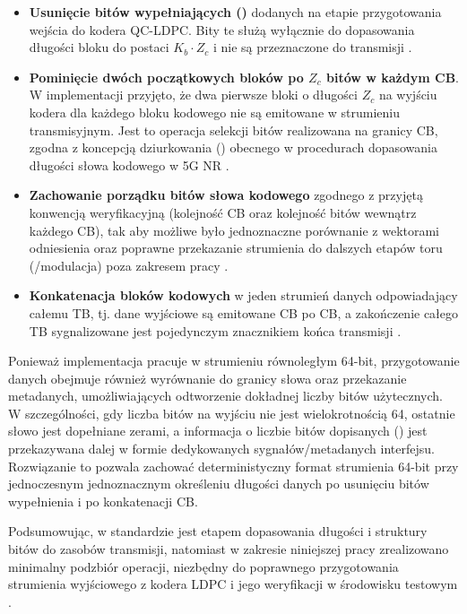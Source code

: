 \begin{itemize}
  \item \textbf{Usunięcie bitów wypełniających ()} dodanych na etapie przygotowania wejścia do kodera QC-LDPC.
  Bity te służą wyłącznie do dopasowania długości bloku do postaci $K_b \cdot Z_c$ i nie są przeznaczone do transmisji \cite{bib:3gpp_38212}.

  \item \textbf{Pominięcie dwóch początkowych bloków po $Z_c$ bitów w każdym CB}.
  W implementacji przyjęto, że dwa pierwsze bloki o długości $Z_c$ na wyjściu kodera dla każdego bloku kodowego nie są emitowane w strumieniu transmisyjnym.
  Jest to operacja selekcji bitów realizowana na granicy CB, zgodna z koncepcją dziurkowania ()  obecnego w procedurach dopasowania długości słowa kodowego w 5G NR \cite{bib:3gpp_38212}.

  \item \textbf{Zachowanie porządku bitów słowa kodowego} zgodnego z przyjętą konwencją weryfikacyjną (kolejność CB oraz kolejność bitów
  wewnątrz każdego CB), tak aby możliwe było jednoznaczne porównanie z wektorami odniesienia oraz poprawne przekazanie strumienia do dalszych
  etapów toru (/modulacja) poza zakresem pracy \cite{bib:3gpp_38212}.

  \item \textbf{Konkatenacja bloków kodowych} w jeden strumień danych odpowiadający całemu TB, tj. dane wyjściowe są emitowane CB po CB,
  a zakończenie całego TB sygnalizowane jest pojedynczym znacznikiem końca transmisji \cite{bib:3gpp_38212}.
\end{itemize}


Ponieważ implementacja pracuje w strumieniu równoległym 64-bit, przygotowanie danych obejmuje również wyrównanie do granicy słowa
oraz przekazanie metadanych, umożliwiających odtworzenie dokładnej liczby bitów użytecznych. W szczególności, gdy liczba bitów na wyjściu
nie jest wielokrotnością 64, ostatnie słowo jest dopełniane zerami, a informacja o liczbie bitów dopisanych () jest przekazywana dalej
w formie dedykowanych sygnałów/metadanych interfejsu. Rozwiązanie to pozwala zachować deterministyczny format strumienia 64-bit przy jednoczesnym
jednoznacznym określeniu długości danych po usunięciu bitów wypełnienia i po konkatenacji CB.

Podsumowując, w standardzie  jest etapem dopasowania długości i struktury bitów do zasobów transmisji,
natomiast w zakresie niniejszej pracy zrealizowano minimalny podzbiór operacji, niezbędny do poprawnego przygotowania strumienia wyjściowego
z kodera LDPC i jego weryfikacji w środowisku testowym \cite{bib:3gpp_38212}.
